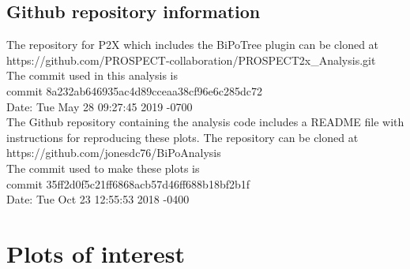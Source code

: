 \subsection{Github repository information\label{sec:github}}
The repository for P2X which includes the BiPoTree plugin can be cloned at\\ https://github.com/PROSPECT-collaboration/PROSPECT2x\_Analysis.git\\
The commit used in this analysis is \\
commit 8a232ab646935ac4d89cceaa38cf96e6c285dc72\\
Date:   Tue May 28 09:27:45 2019 -0700\\

The Github repository containing the analysis code includes a README file with instructions for reproducing these plots. The repository can be cloned at \\
https://github.com/jonesdc76/BiPoAnalysis\\
The commit used to make these plots is\\
commit 35ff2d0f5c21ff6868acb57d46ff688b18bf2b1f\\
Date:   Tue Oct 23 12:55:53 2018 -0400\\
\newpage
\section{Plots of interest}
